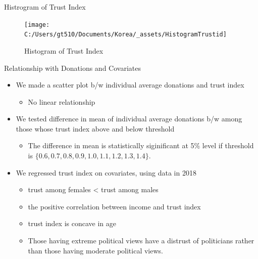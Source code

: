 \documentclass[
  ignorenonframetext,
]{beamer}
\providecommand{\tightlist}{%
  \setlength{\itemsep}{0pt}\setlength{\parskip}{0pt}}
\begin{document}
\begin{frame}{Histrogram of Trust Index}
\protect\hypertarget{histrogram-of-trust-index}{}

\begin{figure}
\texttt{[image: C:/Users/gt510/Documents/Korea/\_assets/HistogramTrustid]} \caption{Histogram of Trust Index}\label{fig:unnamed-chunk-3}
\end{figure}

\end{frame}

\begin{frame}{Relationship with Donations and Covariates}
\protect\hypertarget{relationship-with-donations-and-covariates}{}

\begin{itemize}
\tightlist
\item
  We made a scatter plot b/w individual average donations and trust
  index

  \begin{itemize}
  \tightlist
  \item
    No linear relationship
  \end{itemize}
\item
  We tested difference in mean of individual average donations b/w among
  those whose trust index above and below threshold

  \begin{itemize}
  \tightlist
  \item
    The difference in mean is statistically siginificant at 5\% level if
    threshold is \(\{0.6, 0.7, 0.8, 0.9, 1.0, 1.1, 1.2, 1.3, 1.4\}\).
  \end{itemize}
\item
  We regressed trust index on covariates, using data in 2018

  \begin{itemize}
  \tightlist
  \item
    trust among females \textless{} trust among males
  \item
    the positive correlation between income and trust index
  \item
    trust index is concave in age
  \item
    Those having extreme political views have a distrust of politicians
    rather than those having moderate political views.
  \end{itemize}
\end{itemize}

\end{frame}
\end{document}

